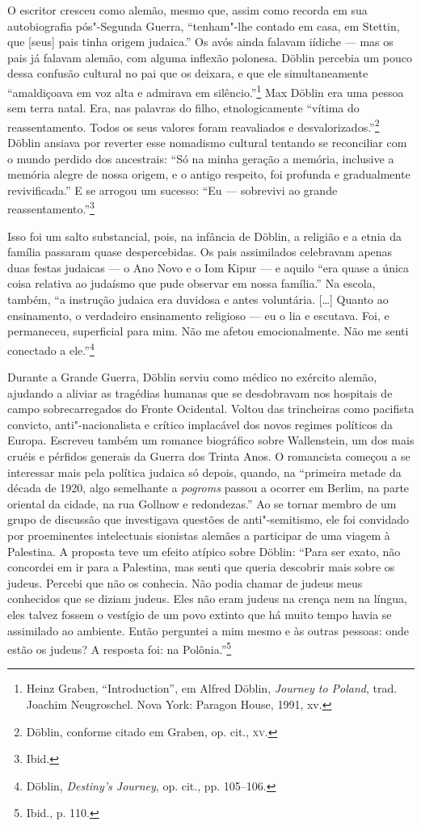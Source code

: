 O escritor cresceu como alemão, mesmo que, assim como recorda em sua
autobiografia pós"-Segunda Guerra, ``tenham"-lhe contado em casa, em
Stettin, que {[}seus{]} pais tinha origem judaica.'' Os avós ainda
falavam iídiche --- mas os pais já falavam alemão, com alguma inflexão
polonesa. Döblin percebia um pouco dessa confusão cultural no pai que os
deixara, e que ele simultaneamente ``amaldiçoava em voz alta e admirava
em silêncio.''\footnote{Heinz Graben, ``Introduction'', em Alfred Döblin, \textit{Journey to Poland}, trad. Joachim Neugroschel. Nova York: Paragon House, 1991, xv.} Max Döblin era uma pessoa sem terra natal. Era, nas palavras do filho, etnologicamente ``vítima do reassentamento.
Todos os seus valores foram reavaliados e desvalorizados.''\footnote{Döblin, conforme citado em Graben, op. cit., \textsc{xv}.} Döblin ansiava por reverter esse nomadismo cultural tentando se reconciliar com o mundo perdido dos
ancestrais: ``Só na minha geração a memória, inclusive a memória alegre
de nossa origem, e o antigo respeito, foi profunda e gradualmente
revivificada.'' E se arrogou um sucesso: ``Eu --- sobrevivi ao grande
reassentamento.''\footnote{Ibid.}

Isso foi um salto substancial, pois, na infância de Döblin, a religião e
a etnia da família passaram quase despercebidas. Os pais assimilados
celebravam apenas duas festas judaicas --- o Ano Novo e o Iom Kipur --- e
aquilo ``era quase a única coisa relativa ao judaísmo que pude observar
em nossa família.'' Na escola, também, ``a instrução judaica era
duvidosa e antes voluntária. [\ldots{}] Quanto ao ensinamento, o
verdadeiro ensinamento religioso --- eu o lia e escutava. Foi, e
permaneceu, superficial para mim. Não me afetou emocionalmente. Não me
senti conectado a ele.''\footnote{Döblin, \textit{Destiny's Journey}, op. cit., pp. 105--106.}

Durante a Grande Guerra, Döblin serviu como médico no exército alemão,
ajudando a aliviar as tragédias humanas que se desdobravam nos hospitais
de campo sobrecarregados do Fronte Ocidental. Voltou das trincheiras
como pacifista convicto, anti"-nacionalista e crítico implacável dos
novos regimes políticos da Europa. Escreveu também um romance biográfico
sobre Wallenstein, um dos mais cruéis e pérfidos generais da Guerra dos
Trinta Anos. O romancista começou a se interessar mais pela política
judaica só depois, quando, na ``primeira metade da década de 1920, algo
semelhante a \textit{pogroms} passou a ocorrer em Berlim, na parte oriental da
cidade, na rua Gollnow e redondezas.'' Ao se tornar membro de um grupo
de discussão que investigava questões de anti"-semitismo, ele foi
convidado por proeminentes intelectuais sionistas alemães a participar
de uma viagem à Palestina. A proposta teve um efeito atípico sobre
Döblin: ``Para ser exato, não concordei em ir para a Palestina, mas
senti que queria descobrir mais sobre os judeus. Percebi que não os
conhecia. Não podia chamar de judeus meus conhecidos que se diziam
judeus. Eles não eram judeus na crença nem na língua, eles talvez fossem
o vestígio de um povo extinto que há muito tempo havia se assimilado ao
ambiente. Então perguntei a mim mesmo e às outras pessoas: onde estão os
judeus? A resposta foi: na Polônia.''\footnote{Ibid., p. 110.}

